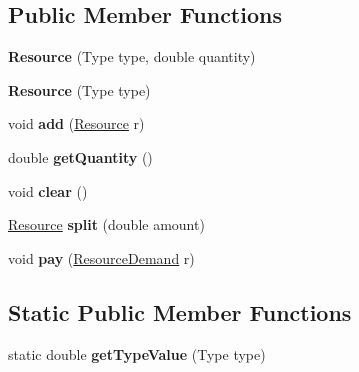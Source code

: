 \subsection*{Public Member Functions}
\begin{DoxyCompactItemize}
\item 
{\bfseries Resource} (Type type, double quantity)\hypertarget{classuniverse_1_1_resource_a77163f908b8d0572a9606dc97ed10b03}{}\label{classuniverse_1_1_resource_a77163f908b8d0572a9606dc97ed10b03}

\item 
{\bfseries Resource} (Type type)\hypertarget{classuniverse_1_1_resource_a9a3fd088bb233ce476f47d8416a32d07}{}\label{classuniverse_1_1_resource_a9a3fd088bb233ce476f47d8416a32d07}

\item 
void {\bfseries add} (\hyperlink{classuniverse_1_1_resource}{Resource} r)\hypertarget{classuniverse_1_1_resource_a1bfc40d650f3af151927b41eba2c0287}{}\label{classuniverse_1_1_resource_a1bfc40d650f3af151927b41eba2c0287}

\item 
double {\bfseries get\+Quantity} ()\hypertarget{classuniverse_1_1_resource_aad810c78f9add4e321748c9d30cf80d8}{}\label{classuniverse_1_1_resource_aad810c78f9add4e321748c9d30cf80d8}

\item 
void {\bfseries clear} ()\hypertarget{classuniverse_1_1_resource_a8579612440fea41492509796b36c344f}{}\label{classuniverse_1_1_resource_a8579612440fea41492509796b36c344f}

\item 
\hyperlink{classuniverse_1_1_resource}{Resource} {\bfseries split} (double amount)\hypertarget{classuniverse_1_1_resource_a2cf7f7c53a2ca5aba3e727abbd8d316a}{}\label{classuniverse_1_1_resource_a2cf7f7c53a2ca5aba3e727abbd8d316a}

\item 
void {\bfseries pay} (\hyperlink{classuniverse_1_1_resource_demand}{Resource\+Demand} r)\hypertarget{classuniverse_1_1_resource_a3f36659adf329d6e1d7d1f1a7719b5ad}{}\label{classuniverse_1_1_resource_a3f36659adf329d6e1d7d1f1a7719b5ad}

\end{DoxyCompactItemize}
\subsection*{Static Public Member Functions}
\begin{DoxyCompactItemize}
\item 
static double {\bfseries get\+Type\+Value} (Type type)\hypertarget{classuniverse_1_1_resource_a5653128bf27f550a12c76fb48eb5e4f0}{}\label{classuniverse_1_1_resource_a5653128bf27f550a12c76fb48eb5e4f0}

\end{DoxyCompactItemize}
